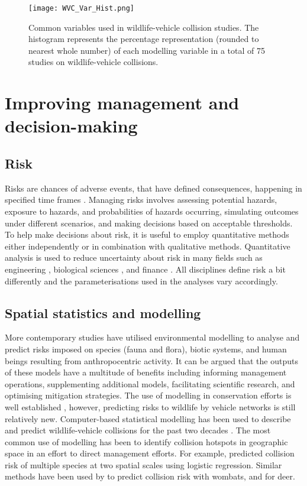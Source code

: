 \begin{figure*}[htp]
  \centering
  \texttt{[image: WVC\_Var\_Hist.png]}
  \caption[Variables used in wildlife-vehicle collision studies]{Common variables used in wildlife-vehicle collision studies. The histogram represents the percentage representation (rounded to nearest whole number) of each modelling variable in a total of 75 studies on wildlife-vehicle collisions.}
  \label{wvc_studies}
\end{figure*}

\section{Improving management and decision-making}

\subsection{Risk}

Risks are chances of adverse events, that have defined consequences, happening in specified time frames \citep{burg05}. Managing risks involves assessing potential hazards, exposure to hazards, and probabilities of hazards occurring, simulating outcomes under different scenarios, and making decisions based on acceptable thresholds. To help make decisions about risk, it is useful to employ quantitative methods either independently or in combination with qualitative methods. Quantitative analysis is used to reduce uncertainty about risk in many fields such as engineering \citep{apos04}, biological sciences \citep{sute16}, and finance \citep{mcne15}.  All disciplines define risk a bit differently and the parameterisations used in the analyses vary accordingly.

\subsection{Spatial statistics and modelling}

More contemporary studies have utilised environmental modelling to analyse and predict risks imposed on species (fauna and flora), biotic systems, and human beings resulting from anthropocentric activity. It can be argued that the outputs of these models have a multitude of benefits including informing management operations, supplementing additional models, facilitating scientific research, and optimising mitigation strategies.  The use of modelling in conservation efforts is well established \citep{star86}, however, predicting risks to wildlife by vehicle networks is still relatively new. Computer-based statistical modelling has been used to describe and predict wildlife-vehicle collisions for the past two decades \citep{guns11}.  The most common use of modelling has been to identify collision hotspots in geographic space in an effort to direct management efforts.  For example, \cite{malo04} predicted collision risk of multiple species at two spatial scales using logistic regression.  Similar methods have been used by \cite{roge09} to predict collision risk with wombats, and \cite{sudh09} for deer.

